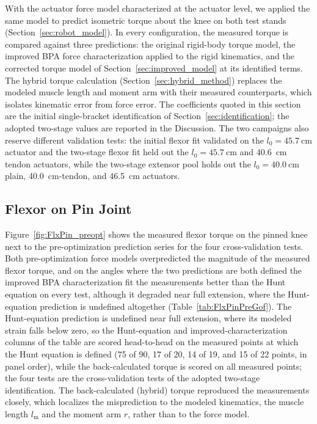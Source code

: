 \documentclass[utf8]{FrontiersinHarvard} %
\begin{document}
With the actuator force model characterized at the actuator level, we applied the same model to predict isometric torque about the knee on both test stands (Section~\ref{sec:robot_model}). In every configuration, the measured torque is compared against three predictions: the original rigid-body torque model, the improved BPA force characterization applied to the rigid kinematics, and the corrected torque model of Section~\ref{sec:improved_model} at its identified terms. The hybrid torque calculation (Section~\ref{sec:hybrid_method}) replaces the modeled muscle length and moment arm with their measured counterparts, which isolates kinematic error from force error. The coefficients quoted in this section are the initial single-bracket identification of Section~\ref{sec:identification}; the adopted two-stage values are reported in the Discussion. The two campaigns also reserve different validation tests: the initial flexor fit validated on the $l_{0}=\qty{45.7}{\cm}$ actuator and the two-stage flexor fit held out the $l_{0}=\qty{45.7}{\cm}$ and \qty{40.6}{\cm} tendon actuators, while the two-stage extensor pool holds out the $l_{0}=\qty{40.0}{\cm}$ plain, \qty{40.0}{\cm}-tendon, and \qty{46.5}{\cm} actuators.

\subsection{Flexor on Pin Joint}

Figure~\ref{fig:FlxPin_preopt} shows the measured flexor torque on the pinned knee next to the pre-optimization prediction series for the four cross-validation tests. Both pre-optimization force models overpredicted the magnitude of the measured flexor torque, and on the angles where the two predictions are both defined the improved BPA characterization fit the measurements better than the Hunt equation on every test, although it degraded near full extension, where the Hunt-equation prediction is undefined altogether (Table~\ref{tab:FlxPinPreGof}). The Hunt-equation prediction is undefined near full extension, where its modeled strain falls below zero, so the Hunt-equation and improved-characterization columns of the table are scored head-to-head on the measured points at which the Hunt equation is defined (75 of 90, 17 of 20, 14 of 19, and 15 of 22 points, in panel order), while the back-calculated torque is scored on all measured points; the four tests are the cross-validation tests of the adopted two-stage identification. The back-calculated (hybrid) torque reproduced the measurements closely, which localizes the misprediction to the modeled kinematics, the muscle length $l_\text{m}$ and the moment arm $r$, rather than to the force model.
\end{document}
